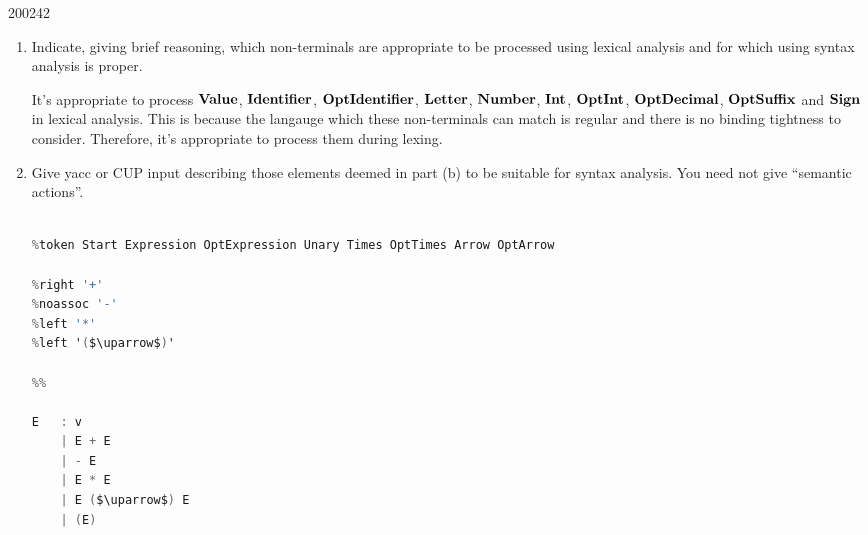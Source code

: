 \documentclass[10pt,\jkfside,a4paper]{article}
\begin{document}
\begin{examquestion}{2002}{4}{2}
\begin{enumerate}
\item Indicate, giving brief reasoning, which non-terminals are appropriate
to be processed using lexical analysis and for which using syntax analysis
is proper.

It's appropriate to process $\mathbf{Value}$, $\mathbf{Identifier}$, $\mathbf{OptIdentifier}$,
$\mathbf{Letter}$, $\mathbf{Number}$, $\mathbf{Int}$, $\mathbf{OptInt}$, $\mathbf{OptDecimal}$, $\mathbf{OptSuffix}$ and
$\mathbf{Sign}$ in lexical analysis. This is because the langauge which these
non-terminals can match is regular and there is no binding tightness to
consider. Therefore, it's appropriate to process them during lexing.

\item Give yacc or CUP input describing those elements deemed in part (b) to
be suitable for syntax analysis. You need not give ``semantic actions''.

\begin{lstlisting}[language=C, escapeinside=()]

%token Start Expression OptExpression Unary Times OptTimes Arrow OptArrow

%right '+'
%noassoc '-'
%left '*'
%left '($\uparrow$)'

%%

E 	: v
	| E + E
	| - E
	| E * E
	| E ($\uparrow$) E
	| (E)

\end{lstlisting}

\end{enumerate}

\end{examquestion}
\end{document}
